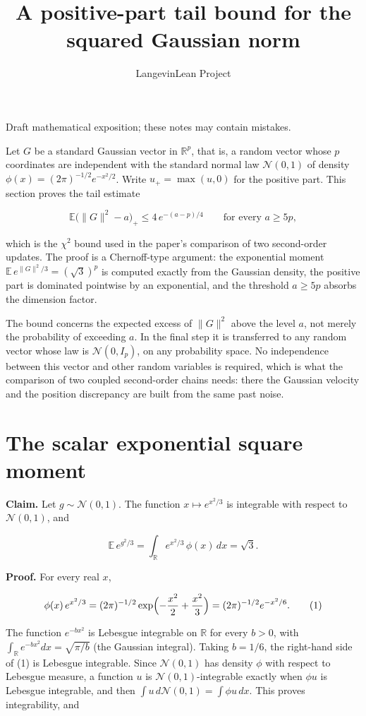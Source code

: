 \documentclass[11pt,a4paper]{article}
\title{\texorpdfstring{A positive-part tail bound for the squared Gaussian norm}{A positive-part tail bound for the squared Gaussian norm}}
\author{LangevinLean Project}
\date{}
\begin{document}
\maketitle
Draft mathematical exposition; these notes may contain mistakes.


Let \(G\) be a standard Gaussian vector in \(\mathbb R^p\), that is, a random vector whose \(p\) coordinates are independent with the standard normal law \(\mathcal N(0,1)\) of density \(\phi(x)=(2\pi)^{-1/2}e^{-x^2/2}\). Write \(u_+=\max(u,0)\) for the positive part. This section proves the tail estimate


\[\mathbb E\bigl(\|G\|^2-a\bigr)_+\le4\,e^{-(a-p)/4}\qquad\text{for every }a\ge5p,\]


which is the \(\chi^2\) bound used in the paper's comparison of two second-order updates. The proof is a Chernoff-type argument: the exponential moment \(\mathbb E\,e^{\|G\|^2/3}=(\sqrt3)^p\) is computed exactly from the Gaussian density, the positive part is dominated pointwise by an exponential, and the threshold \(a\ge5p\) absorbs the dimension factor.




The bound concerns the expected excess of \(\|G\|^2\) above the level \(a\), not merely the probability of exceeding \(a\). In the final step it is transferred to any random vector whose law is \(\mathcal N(0,I_p)\), on any probability space. No independence between this vector and other random variables is required, which is what the comparison of two coupled second-order chains needs: there the Gaussian velocity and the position discrepancy are built from the same past noise.


\section{\texorpdfstring{The scalar exponential square moment}{The scalar exponential square moment}}


\textbf{Claim.} Let \(g\sim\mathcal N(0,1)\). The function \(x\mapsto e^{x^2/3}\) is integrable with respect to \(\mathcal N(0,1)\), and


\[\mathbb E\,e^{g^2/3}=\int_{\mathbb R}e^{x^2/3}\,\phi(x)\,dx=\sqrt3.\]


\textbf{Proof.} For every real \(x\),


\[\phi(x)\,e^{x^2/3}=(2\pi)^{-1/2}\exp\Bigl(-\frac{x^2}{2}+\frac{x^2}{3}\Bigr)=(2\pi)^{-1/2}e^{-x^2/6}.\qquad(1)\]


The function \(e^{-bx^2}\) is Lebesgue integrable on \(\mathbb R\) for every \(b>0\), with \(\int_{\mathbb R}e^{-bx^2}dx=\sqrt{\pi/b}\) (the Gaussian integral). Taking \(b=1/6\), the right-hand side of (1) is Lebesgue integrable. Since \(\mathcal N(0,1)\) has density \(\phi\) with respect to Lebesgue measure, a function \(u\) is \(\mathcal N(0,1)\)-integrable exactly when \(\phi u\) is Lebesgue integrable, and then \(\int u\,d\mathcal N(0,1)=\int\phi u\,dx\). This proves integrability, and
\end{document}
